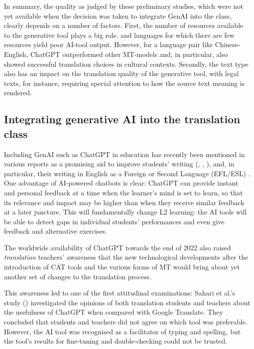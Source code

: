 \documentclass[output=paper]{langscibook}
\begin{document}
In summary, the quality as judged by these preliminary studies, which were not yet available when the decision was taken to integrate GenAI into the class, clearly depends on a number of factors. First, the number of resources available to the generative tool plays a big role, and languages for which there are few resources yield poor AI-tool output. However, for a language pair like Chinese-English, ChatGPT outperformed other MT-models and, in particular, also showed successful translation choices in cultural contexts.  Secondly, the text type also has an impact on the translation quality of the generative tool, with legal texts, for instance, requiring special attention to how the source text meaning is rendered.  


\subsection{Integrating generative AI into the translation class}

Including GenAI such as ChatGPT in education has recently been mentioned in various reports as a promising aid to improve students’ writing (\citealt{cao2023exploringeffectivenesschatgptbasedfeedback}, \citealt{labadze23}, \citealt{ouyang2023_aieducation}), and, in particular, their writing in English as a Foreign or Second Language (EFL/ESL) \citep{fitria23}. One advantage of AI-powered chatbots is clear: ChatGPT can provide instant and personal feedback at a time when the learner’s mind is set to learn, so that its relevance and impact may be higher than when they receive similar feedback at a later juncture. This will fundamentally change L2 learning: the AI tools will be able to detect gaps in individual students’ performances and even give feedback and alternative exercises.

The worldwide availability of ChatGPT towards the end of 2022 also raised \textit{translation} teachers’ awareness that the new technological developments after the introduction of CAT tools and the various forms of MT would bring about yet another set of changes to the translation process. 

This awareness led to one of the first attitudinal examinations: Sahari et al.’s study (\citeyear{sahari2023}) investigated the opinions of both translation students and teachers about the usefulness of ChatGPT when compared with Google Translate. They concluded that students and teachers did not agree on which tool was preferable. However, the AI tool was recognised as a facilitator of typing and spelling, but the tool’s results for fine-tuning and double-checking could not be trusted.
\end{document}
